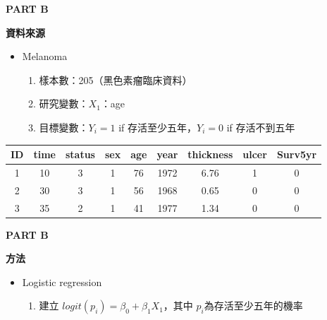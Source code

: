 \documentclass[12pt,aspectratio=43]{beamer}
\begin{document}
\begin{frame}[t]{\textbf{PART B}} 
\vspace*{10pt}
{
\setlength{\baselineskip}{1.3\baselineskip}   %
{
\Large
\parbox{\linewidth}{\raggedright \textbf{資料來源}}
}
}

\begin{itemize}
    \item Melanoma
  \begin{enumerate}[]
    \setlength{\itemsep}{6pt}
    \item 樣本數：205（黑色素瘤臨床資料）
    \item 研究變數：$X_1$：age
    \item 目標變數：$Y_i=1$ if 存活至少五年，$Y_i=0$ if 存活不到五年
  \end{enumerate}
\end{itemize}

\begin{table}[H]
\centering
\footnotesize
\begin{tabular}{c c c c c c c c c}
\hline
ID & time & status & sex & age & year & thickness & ulcer & Surv5yr\\
\hline
1 & 10 & 3 & 1 & 76 & 1972 & 6.76 & 1 & 0 \\
2 & 30 & 3 & 1 & 56 & 1968 & 0.65 & 0 & 0 \\
3 & 35 & 2 & 1 & 41 & 1977 & 1.34 & 0 & 0 \\
\hline
\end{tabular}
\end{table}


\end{frame}

\begin{frame}[t]{\textbf{PART B}}
\linespread{1.5}
{\Large \setlength{\baselineskip}{20pt} \parbox{\linewidth}{\raggedright \textbf{方法}}}
\begin{itemize}
    \item Logistic regression
    \begin{enumerate}[]
        \item 建立 $logit(p_i) = \beta_0+\beta_1X_1$，其中 $p_i$為存活至少五年的機率

    \end{enumerate}

\end{itemize}
   

\end{frame}
\end{document}
